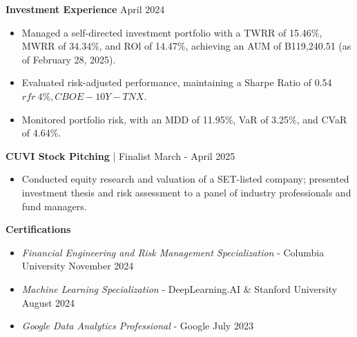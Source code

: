 \documentclass[a4paper, 11pt]{article}
\begin{document}
\textbf{Investment Experience} \hfill April 2024
\begin{itemize}[noitemsep, topsep=0pt, partopsep=0pt, parsep=0pt, leftmargin=20pt]
    \item Managed a self-directed investment portfolio with a TWRR of 15.46\%, MWRR of 34.34\%, and ROl of 14.47\%, achieving an AUM of B119,240.51 (as of February 28, 2025).
    \item Evaluated risk-adjusted performance, maintaining a Sharpe Ratio of 0.54 \(rfr ~ 4\%, CBOE-10Y-TNX\).
    \item Monitored portfolio risk, with an MDD of 11.95\%, VaR of 3.25\%, and CVaR of 4.64\%.
\end{itemize}
\vspace{3pt}

\textbf{CUVI Stock Pitching} | Finalist \hfill March - April 2025
\begin{itemize}[noitemsep, topsep=0pt, partopsep=0pt, parsep=0pt, leftmargin=20pt]
    \item Conducted equity research and valuation of a SET-listed company; presented investment thesis and risk assessment to a panel of industry professionals and fund managers.
\end{itemize}
\vspace{3pt}


\textbf{Certifications}
\begin{itemize}[noitemsep, topsep=0pt, partopsep=0pt, parsep=0pt, leftmargin=20pt]
    \item \textit{Financial Engineering and Risk Management Specialization} - Columbia University \hfill November 2024
    \item \textit{Machine Learning Specialization} - DeepLearning.AI \& Stanford University \hfill August 2024
    \item \textit{Google Data Analytics Professional} - Google \hfill July 2023
\end{itemize}
\end{document}
